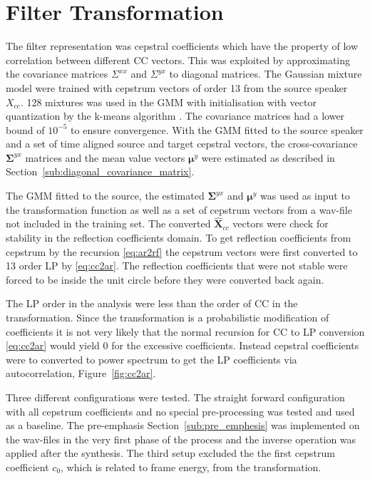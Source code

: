 \section{Filter Transformation} %
\label{sec:filter_transformation}

The filter representation was cepstral coefficients which have the property of low correlation between different CC vectors. This was exploited by approximating the covariance matrices $\Sigma^{xx}$ and $\Sigma^{yx}$ to diagonal matrices. The Gaussian mixture model were trained with cepstrum vectors of order 13 from the source speaker $X_{cc}$. 128 mixtures was used in the GMM with initialisation with vector quantization by the k-means algorithm . The covariance matrices had a lower bound of $10^{-5}$ to ensure convergence. With the GMM fitted to the source speaker and a set of time aligned source and target cepstral vectors, the cross-covariance $\mathbf{\Sigma}^{yx}$ matrices and the mean value vectors $\boldsymbol{\mu}^y$ were estimated as described in Section~\ref{sub:diagonal_covariance_matrix}.

The GMM fitted to the source, the estimated $\mathbf{\Sigma}^{yx}$ and $\boldsymbol{\mu}^y$ was used as input to the transformation function as well as a set of cepstrum vectors from a wav-file not included in the training set. The converted $\mathbf{\hat{X}}_{cc}$ vectors were check for stability in the reflection coefficients domain. To get reflection coefficients from cepstrum by the recursion \eqref{eq:ar2rf} the cepstrum vectors were first converted to 13 order LP by \eqref{eq:cc2ar}. The reflection coefficients that were not stable were forced to be inside the unit circle before they were converted back again. 

The LP order in the analysis were less than the order of CC in the transformation. Since the transformation is a probabilistic modification of coefficients it is not very likely that the normal recursion for CC to LP conversion \eqref{eq:cc2ar} would yield 0 for the excessive coefficients. Instead cepstral coefficients were to converted to power spectrum to get the LP coefficients via autocorrelation, Figure~\ref{fig:cc2ar}.

Three different configurations were tested. The straight forward configuration with all cepstrum coefficients and no special pre-processing was tested and used as a baseline. The pre-emphasis Section~\ref{sub:pre_emphesis} was implemented on the wav-files in the very first phase of the process and the inverse operation was applied after the synthesis. The third setup excluded the the first cepstrum coefficient $c_0$, which is related to frame energy, from the transformation.

